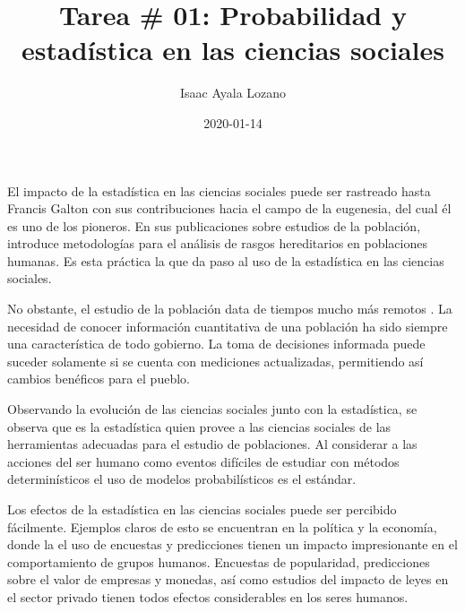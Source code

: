 \documentclass[a4paper,12pt]{article}
\title{Tarea \# 01: Probabilidad y estadística en las ciencias sociales}
\author{Isaac Ayala Lozano}
\date{2020-01-14}
\begin{document}
\maketitle

El impacto de la estadística en las ciencias sociales puede ser rastreado hasta Francis Galton \cite{galton1883inquiries} con sus contribuciones hacia el campo de la eugenesia, del cual él es uno de los pioneros.
En sus publicaciones sobre estudios de la población, introduce metodologías para el análisis de rasgos hereditarios en poblaciones humanas.
Es esta práctica la que da paso al uso de la estadística en las ciencias sociales.

No obstante, el estudio de la población data de tiempos mucho más remotos \cite{courgeau2012probability}. 
La necesidad de conocer información cuantitativa de una población ha sido siempre una característica de todo gobierno.
La toma de decisiones informada puede suceder solamente si se cuenta con mediciones actualizadas, permitiendo así cambios benéficos para el pueblo.

Observando la evolución de las ciencias sociales junto con la estadística, se observa que es la estadística quien provee a las ciencias sociales de las herramientas adecuadas para el estudio de poblaciones.
Al considerar a las acciones del ser humano como eventos difíciles de estudiar con métodos determinísticos \cite{courgeau2012probability} el uso de modelos probabilísticos es el estándar.

Los efectos de la estadística en las ciencias sociales puede ser percibido fácilmente. 
Ejemplos claros de esto se encuentran en la política y la economía, donde la el uso de encuestas y predicciones tienen un impacto impresionante en el comportamiento de grupos humanos.
Encuestas de popularidad, predicciones sobre el valor de empresas y monedas, así como estudios del impacto de leyes en el sector privado tienen todos efectos considerables en los seres humanos.


\printbibliography
\end{document}
